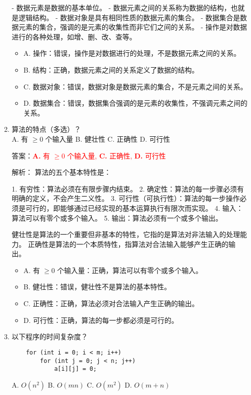 \documentclass[lang=cn,newtx,10pt,scheme=chinese]{../../../elegantbook}
\begin{document}
\begin{enumerate}
    - 数据元素是数据的基本单位。
    - 数据元素之间的关系称为数据的结构，也就是逻辑结构。
    - 数据对象是具有相同性质的数据元素的集合。
    - 数据集合是数据元素的集合，强调的是元素的收集性而非它们之间的关系。
    - 操作是对数据进行的各种处理，如增、删、改、查等。

    \begin{itemize}
        \item A. 操作：错误，操作是对数据进行的处理，不是数据元素之间的关系。
        \item B. 结构：正确，数据元素之间的关系定义了数据的结构。
        \item C. 数据对象：错误，数据对象是数据元素的集合，不是元素之间的关系。
        \item D. 数据集合：错误，数据集合强调的是元素的收集性，不强调元素之间的关系。
    \end{itemize}

    \item 算法的特点（多选）？\\
    A. 有 $\geq 0$ 个输入量 \quad B. 健壮性 \quad C. 正确性 \quad D. 可行性

    答案：\textcolor{red}{\textbf{A.} 有 $\geq 0$ 个输入量, \textbf{C.} 正确性, \textbf{D.} 可行性}

    解析：
    算法的五个基本特性是：
    
    1. 有穷性：算法必须在有限步骤内结束。
    2. 确定性：算法的每一步骤必须有明确的定义，不会产生二义性。
    3. 可行性（可执行性）：算法的每一步操作必须是可行的，即能够通过已经实现的基本运算执行有限次而实现。
    4. 输入：算法可以有零个或多个输入。
    5. 输出：算法必须有一个或多个输出。
    
    健壮性是算法的一个重要但非基本的特性，它指的是算法对非法输入的处理能力。
    正确性是算法的一个本质特性，指算法对合法输入能够产生正确的输出。

    \begin{itemize}
        \item A. 有 $\geq 0$ 个输入量：正确，算法可以有零个或多个输入。
        \item B. 健壮性：错误，健壮性不是算法的基本特性。
        \item C. 正确性：正确，算法必须对合法输入产生正确的输出。
        \item D. 可行性：正确，算法的每一步都必须是可行的。
    \end{itemize}

    \item 以下程序的时间复杂度？
    \begin{verbatim}
    for (int i = 0; i < m; i++)
        for (int j = 0; j < n; j++)
            a[i][j] = 0;
    \end{verbatim}
    A. $O(n^2)$ \quad B. $O(mn)$ \quad C. $O(m^2)$ \quad D. $O(m+n)$


\end{enumerate}
\end{document}
